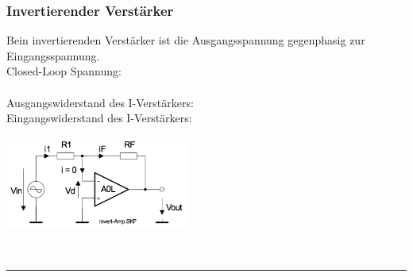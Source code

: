 		\subsubsection{Invertierender Verstärker }
			\begin{minipage}[T]{12cm}
          	  Bein invertierenden Verstärker ist die Ausgangsspannung gegenphasig
            	zur Eingangsspannung.\\
            	Closed-Loop Spannung:
            	\hspace{23mm}\\
            	\hspace*{10mm}
           		\hspace{29.5mm}\\
            	Ausgangswiderstand des I-Verstärkers: \\
            	Eingangswiderstand des I-Verstärkers:
            	\hspace{0.5mm}
            \end{minipage}
			\begin{minipage}{6cm}
            	\includegraphics[width=6cm]{./bilder/i-verstaerker.png}
            \end{minipage}\\

\hrule

